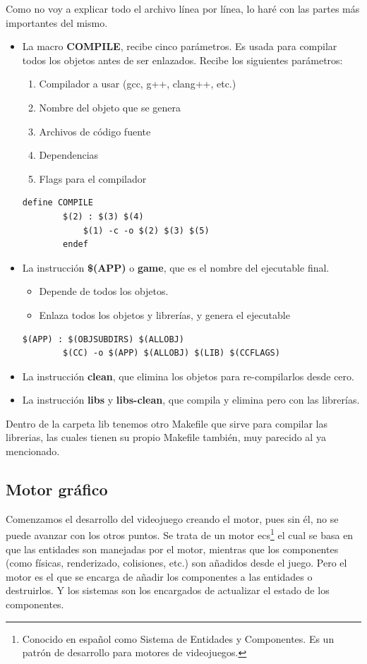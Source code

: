Como no voy a explicar todo el archivo línea por línea, lo haré con las partes más importantes del mismo. 
\begin{itemize}
	\item La macro \textbf{COMPILE}, recibe cinco parámetros. Es usada para compilar todos los objetos antes de ser enlazados. Recibe los siguientes parámetros:
	\begin{enumerate}
		\item Compilador a usar (gcc, g++, clang++, etc.)
		\item Nombre del objeto que se genera
		\item Archivos de código fuente
		\item Dependencias
		\item Flags para el compilador
	\end{enumerate}
	\begin{lstlisting}[style=C, caption={Macro Compile del Makefile},label=C_code]
		define COMPILE
		$(2) : $(3) $(4)
			$(1) -c -o $(2) $(3) $(5)
		endef
	\end{lstlisting}
	\item La instrucción \textbf{\$(APP)} o \textbf{game}, que es el nombre del ejecutable final. 
	\begin{itemize} 
		\item Depende de todos los objetos. 
		\item Enlaza todos los objetos y librerías, y genera el ejecutable
	\end{itemize}
	\begin{lstlisting}[style=C, caption={Enlazado de los objetos y las librerísa para generar el ejecutable.},label=C_code]
	$(APP) : $(OBJSUBDIRS) $(ALLOBJ)
		$(CC) -o $(APP) $(ALLOBJ) $(LIB) $(CCFLAGS)
	\end{lstlisting}
	\item La instrucción \textbf{clean}, que elimina los objetos para re-compilarlos desde cero.
	\item La instrucción \textbf{libs} y \textbf{libs-clean}, que compila y elimina pero con las librerías.
\end{itemize}
Dentro de la carpeta lib tenemos otro Makefile que sirve para compilar las librerias, las cuales tienen su propio Makefile también, muy parecido al ya mencionado.

\subsection{Motor gráfico}
Comenzamos el desarrollo del videojuego creando el motor, pues sin él, no se puede avanzar con los otros puntos. Se trata de un motor \gls{ecs}\footnote{Conocido en español como Sistema de Entidades y Componentes. Es un patrón de desarrollo para motores de videojuegos.} el cual se basa en que las entidades son manejadas por el motor, mientras que los componentes (como físicas, renderizado, colisiones, etc.) son añadidos desde el juego. Pero el motor es el que se encarga de añadir los componentes a las entidades o destruirlos. Y los sistemas son los encargados de actualizar el estado de los componentes.

